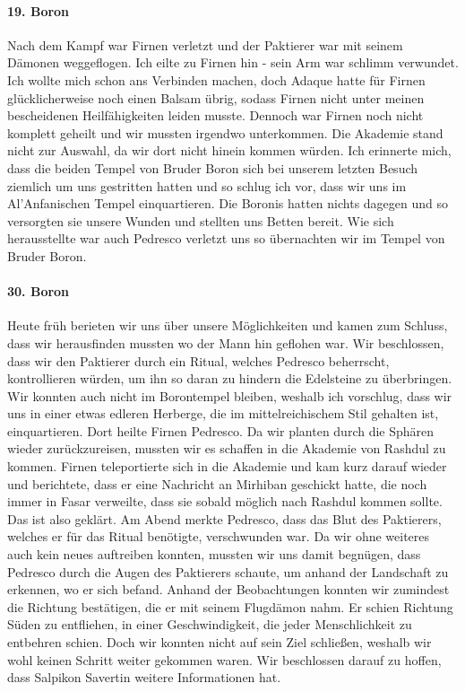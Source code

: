 \paragraph{19. Boron}
Nach dem Kampf war Firnen verletzt und der Paktierer war mit seinem Dämonen weggeflogen. Ich eilte zu Firnen hin - sein Arm war schlimm verwundet. Ich wollte mich schon ans Verbinden machen, doch Adaque hatte für Firnen glücklicherweise noch einen Balsam übrig, sodass Firnen nicht unter meinen bescheidenen Heilfähigkeiten leiden musste. Dennoch war Firnen noch nicht komplett geheilt und wir mussten irgendwo unterkommen. Die Akademie stand nicht zur Auswahl, da wir dort nicht hinein kommen würden. Ich erinnerte mich, dass die beiden Tempel von Bruder Boron sich bei unserem letzten Besuch ziemlich um uns gestritten hatten und so schlug ich vor, dass wir uns im Al'Anfanischen Tempel einquartieren. Die Boronis hatten nichts dagegen und so versorgten sie unsere Wunden und stellten uns Betten bereit. Wie sich herausstellte war auch Pedresco verletzt uns so übernachten wir im Tempel von Bruder Boron.

\paragraph{30. Boron}
Heute früh berieten wir uns über unsere Möglichkeiten und kamen zum Schluss, dass wir herausfinden mussten wo der Mann hin geflohen war. Wir beschlossen, dass wir den Paktierer durch ein Ritual, welches Pedresco beherrscht, kontrollieren würden, um ihn so daran zu hindern die Edelsteine zu überbringen. Wir konnten auch nicht im Borontempel bleiben, weshalb ich vorschlug, dass wir uns in einer etwas edleren Herberge, die im mittelreichischem Stil gehalten ist, einquartieren. Dort heilte Firnen Pedresco. Da wir planten durch die Sphären wieder zurückzureisen, mussten wir es schaffen in die Akademie von Rashdul zu kommen. Firnen teleportierte sich in die Akademie und kam kurz darauf wieder und berichtete, dass er eine Nachricht an Mirhiban geschickt hatte, die noch immer in Fasar verweilte, dass sie sobald möglich nach Rashdul kommen sollte. Das ist also geklärt. Am Abend merkte Pedresco, dass das Blut des Paktierers, welches er für das Ritual benötigte, verschwunden war. Da wir ohne weiteres auch kein neues auftreiben konnten, mussten wir uns damit begnügen, dass Pedresco durch die Augen des Paktierers schaute, um anhand der Landschaft zu erkennen, wo er sich befand. Anhand der Beobachtungen konnten wir zumindest die Richtung bestätigen, die er mit seinem Flugdämon nahm. Er schien Richtung Süden zu entfliehen, in einer Geschwindigkeit, die jeder Menschlichkeit zu entbehren schien. Doch wir konnten nicht auf sein Ziel schließen, weshalb wir wohl keinen Schritt weiter gekommen waren. Wir beschlossen darauf zu hoffen, dass Salpikon Savertin weitere Informationen hat.


